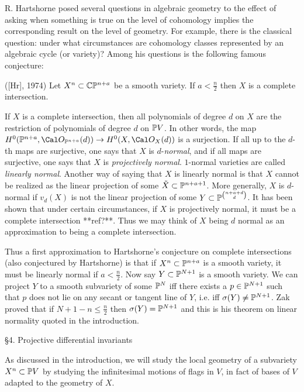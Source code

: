 R. Hartshorne posed several questions in algebraic geometry to the
effect of asking when something is true on the level of cohomology 
implies the corresponding result on the level of geometry. For example, 
there is the classical question: under
what circumstances are cohomology classes represented by an algebraic
cycle (or variety)? Among his questions is the following
famous conjecture:


 

([Hr],
1974)
Let $X^n\subset\Bbb C\Bbb P^{n+a}$ be a smooth variety. If 
$a<\frac n2$ then $X$ is a complete intersection.
\endproclaim

 
If $X$ is a complete intersection, then all polynomials of degree
$d$ on $X$ are the restriction of polynomials of degree
$d$ on $\Bbb P V$. In other words, the map
$H^0(\pp\na, \Cal O_{\pp\na}(d))\ra H^0(X,\Cal O_X (d))$
is a surjection.  If  all up to 
 the $d$-th maps are surjective, one
says that
$X$ is $d$-{\it normal}, and if all maps are surjective,
one says that $X$ is {\it projectively normal}. $1$-normal
varieties are called {\it linearly normal}.  Another way of saying
that $X$ is linearly normal is that $X$ cannot be
realized as the linear projection of some $\tilde X\subset\Bbb P^{n+a+1}$.
More generally, $X$ is $d$-normal if $v_d(X)$ is not the linear projection
of some $Y\subset\Bbb P^{\binom{n+a +d}d}$. It
has been shown that under certain
circumstances, if $X$ is projectively normal, it must be
a complete intersection **ref?**. Thus we may think of $X$ being $d$
normal   as an approximation to being a complete intersection.


 Thus a first approximation to Hartshorne's conjecture
on complete intersections
(also conjectured by Hartshorne) is that if $X^n\subset\Bbb P^{n+a}$ is
a smooth variety, it must be linearly normal if 
$a<\frac n2$. Now say
$Y\subset\Bbb P^{ N+1}$ is a smooth variety. We can project $Y$ 
to a smooth subvariety of some $\Bbb P^{N}$ iff there exists
a $p\in \Bbb P^{N+1}$ such that $p$ does not lie on any secant
or tangent line of $Y$, i.e. iff $\sigma (Y)\neq\Bbb P^{N+1}$.
Zak proved that if $N+1-n\leq\frac n2$ then $\sigma (Y)=\Bbb P^{N+1}$
and this is his theorem on linear normality quoted in the introduction.

 
 
 
\heading\S  4.  Projective differential invariants\endheading

 

As discussed in the introduction, we will study the local geometry
of a subvariety $X^n\subset\Bbb P V$ by studying the infinitesimal motions
of flags in $V$, in fact of bases of $V$ adapted to
the geometry of $X$.


